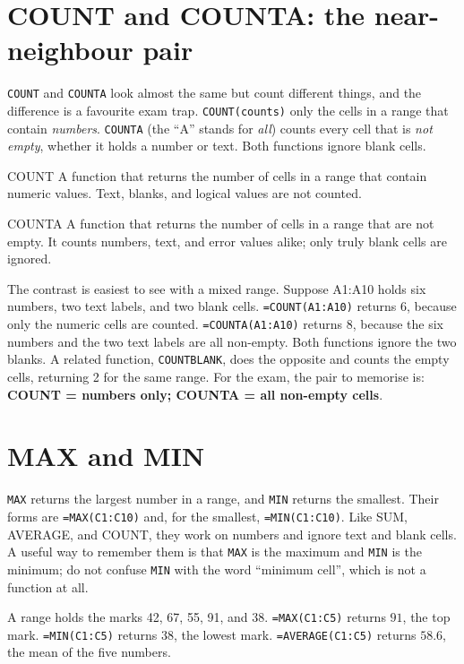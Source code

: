 \section{COUNT and COUNTA: the near-neighbour pair}
\texttt{COUNT} and \texttt{COUNTA} look almost the same but count different
things, and the difference is a favourite exam trap. \texttt{COUNT(counts)}
only the cells in a range that contain \emph{numbers}. \texttt{COUNTA} (the
``A'' stands for \emph{all}) counts every cell that is \emph{not empty},
whether it holds a number or text. Both functions ignore blank cells.

\begin{definitionbox}{COUNT}
A function that returns the number of cells in a range that contain numeric
values. Text, blanks, and logical values are not counted.
\end{definitionbox}

\begin{definitionbox}{COUNTA}
A function that returns the number of cells in a range that are not empty. It
counts numbers, text, and error values alike; only truly blank cells are
ignored.
\end{definitionbox}

The contrast is easiest to see with a mixed range. Suppose A1:A10 holds six
numbers, two text labels, and two blank cells. \texttt{=COUNT(A1:A10)}
returns 6, because only the numeric cells are counted. \texttt{=COUNTA(A1:A10)}
returns 8, because the six numbers and the two text labels are all non-empty.
Both functions ignore the two blanks. A related function, \texttt{COUNTBLANK},
does the opposite and counts the empty cells, returning 2 for the same range.
For the exam, the pair to memorise is: \textbf{COUNT = numbers only; COUNTA =
all non-empty cells}.

\section{MAX and MIN}
\texttt{MAX} returns the largest number in a range, and \texttt{MIN} returns
the smallest. Their forms are \texttt{=MAX(C1:C10)} and, for the smallest,
\texttt{=MIN(C1:C10)}. Like SUM, AVERAGE, and COUNT, they work on numbers and
ignore text and blank cells. A useful way to remember them is that \texttt{MAX}
is the maximum and \texttt{MIN} is the minimum; do not confuse \texttt{MIN}
with the word ``minimum cell'', which is not a function at all.

\begin{example}
A range holds the marks 42, 67, 55, 91, and 38. \texttt{=MAX(C1:C5)} returns
$91$, the top mark. \texttt{=MIN(C1:C5)} returns $38$, the lowest mark.
\texttt{=AVERAGE(C1:C5)} returns $58.6$, the mean of the five numbers.
\end{example}

